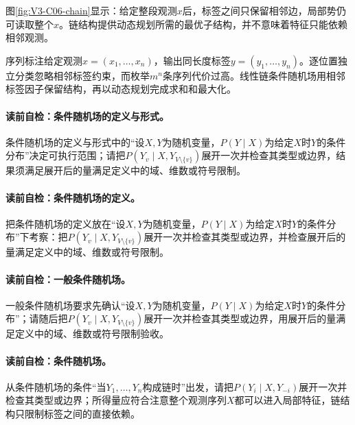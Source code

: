 \label{struct:V3-C06-CH17}

图\ref{fig:V3-C06-chain}显示：给定整段观测$x$后，标签之间只保留相邻边，局部势仍可读取整个$x$。链结构提供动态规划所需的最优子结构，并不意味着特征只能依赖相邻观测。


序列标注给定观测$x=(x_1,\ldots,x_n)$，输出同长度标签$y=(y_1,\ldots,y_n)$。逐位置独立分类忽略相邻标签约束，而枚举$m^n$条序列代价过高。线性链条件随机场用相邻标签因子保留结构，再以动态规划完成求和和最大化。

\paragraph{读前自检：条件随机场的定义与形式。}条件随机场的定义与形式中的“设$X,Y$为随机变量，$P(Y\mid X)$为给定$X$时$Y$的条件分布”决定可执行范围；请把$P(Y_v\mid X,Y_{V\setminus\{v\}})$展开一次并检查其类型或边界，结果须满足展开后的量满足定义中的域、维数或符号限制。\par
\paragraph{读前自检：条件随机场的定义。}把条件随机场的定义放在“设$X,Y$为随机变量，$P(Y\mid X)$为给定$X$时$Y$的条件分布”下考察：把$P(Y_v\mid X,Y_{V\setminus\{v\}})$展开一次并检查其类型或边界，并检查展开后的量满足定义中的域、维数或符号限制。\par
\paragraph{读前自检：一般条件随机场。}一般条件随机场要求先确认“设$X,Y$为随机变量，$P(Y\mid X)$为给定$X$时$Y$的条件分布”；请随后把$P(Y_v\mid X,Y_{V\setminus\{v\}})$展开一次并检查其类型或边界，用展开后的量满足定义中的域、维数或符号限制验收。\par

\paragraph{读前自检：条件随机场。}从条件随机场的条件“当$Y_1,\ldots,Y_n$构成链时”出发，请把$P(Y_i\mid X,Y_{-i})$展开一次并检查其类型或边界；所得量应符合注意整个观测序列$X$都可以进入局部特征，链结构只限制标签之间的直接依赖。\par

